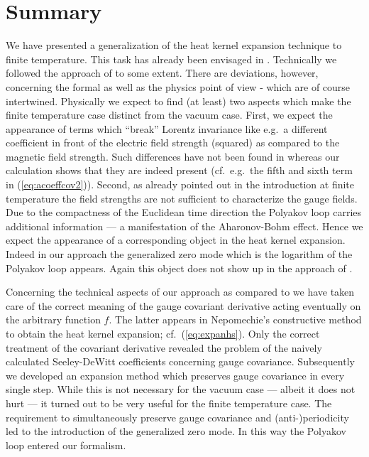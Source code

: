 \documentclass[a4paper,showpacs,showkeys,prd,nofootinbib]{revtex4}
\begin{document}
\section{Summary}
\label{sec:sum}

We have presented a generalization of the heat kernel expansion technique to finite
temperature. This task has already been envisaged in \cite{Boschi-Filho:1992ah}. Technically
we followed the approach of \cite{Boschi-Filho:1992ah} to some extent. There are deviations,
however, concerning the formal as well as the physics point of view - which are of
course intertwined. Physically we expect to find (at least) two aspects which make the 
finite temperature case distinct from the vacuum case. First, we expect the appearance
of terms which ``break'' Lorentz invariance like e.g.~a different coefficient
in front of the electric field strength (squared) as compared to the magnetic
field strength. Such differences have not been found in \cite{Boschi-Filho:1992ah} whereas
our calculation shows that they are indeed present (cf.~e.g.~the fifth and sixth
term in (\ref{eq:acoeffcov2})). Second, as already pointed out in the introduction
at finite temperature the field strengths are not sufficient to characterize the
gauge fields. Due to the compactness of the Euclidean time direction the Polyakov
loop carries additional information --- a manifestation of the Aharonov-Bohm effect. 
Hence we expect the appearance of a corresponding
object in the heat kernel expansion. Indeed in our approach the generalized zero mode
which is the logarithm of the Polyakov loop appears. Again this object does not
show up in the approach of \cite{Boschi-Filho:1992ah}. 

Concerning the technical aspects of our approach as compared to 
\cite{Boschi-Filho:1992ah} we have taken care of the correct meaning of the
gauge covariant derivative acting eventually on the arbitrary function $f$.
The latter appears in Nepomechie's constructive method to obtain the heat kernel 
expansion; cf.~(\ref{eq:expanhs}). Only the correct treatment of the covariant
derivative revealed the problem of the naively calculated Seeley-DeWitt coefficients
concerning gauge covariance. Subsequently we developed an expansion method 
which preserves gauge covariance in every single step. While this is not necessary
for the vacuum case --- albeit it does not hurt --- it turned out to be very useful
for the finite temperature case. The requirement to 
simultaneously preserve gauge covariance and (anti-)periodicity led to the introduction
of the generalized zero mode. In this way the Polyakov loop entered our formalism.
\end{document}
